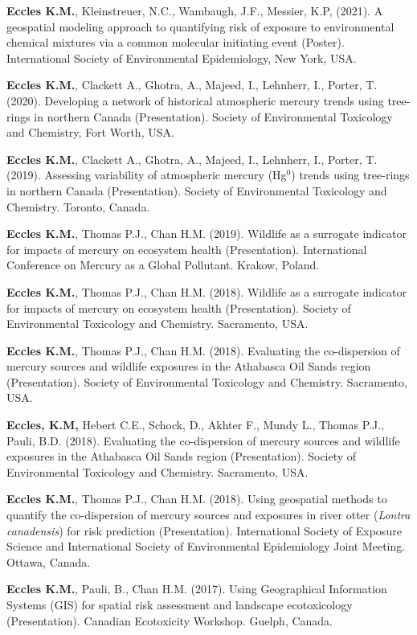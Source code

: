 \documentclass[margin,line]{res}
\begin{document}
\begin{resume}
\textbf{Eccles K.M.}, Kleinstreuer, N.C., Wambaugh, J.F., Messier, K.P, (2021). A geospatial modeling approach to quantifying risk of exposure to environmental chemical mixtures via a common molecular initiating event (Poster). International Society of Environmental Epidemiology, New York, USA.

\textbf{Eccles K.M.}, Clackett A., Ghotra, A., Majeed, I., Lehnherr, I., Porter, T. (2020). Developing a network of historical atmospheric mercury trends using tree-rings in northern Canada (Presentation).  Society of Environmental Toxicology and Chemistry, Fort Worth, USA.

\textbf{Eccles K.M.}, Clackett A., Ghotra, A., Majeed, I., Lehnherr, I., Porter, T. (2019). Assessing variability of atmospheric mercury (Hg$^{0}$) trends using tree-rings in northern Canada (Presentation). Society of Environmental Toxicology and Chemistry. Toronto, Canada.

\textbf{Eccles K.M.}, Thomas P.J., Chan H.M. (2019). Wildlife as a surrogate indicator for impacts of mercury on ecosystem health (Presentation). International Conference on Mercury as a Global Pollutant. Krakow, Poland.

\textbf{Eccles K.M.}, Thomas P.J., Chan H.M. (2018). Wildlife as a surrogate indicator for impacts of mercury on ecosystem health (Presentation). Society of Environmental Toxicology and Chemistry. Sacramento, USA.

\textbf{Eccles K.M.}, Thomas P.J., Chan H.M. (2018). Evaluating the co-dispersion of mercury sources and wildlife exposures in the Athabasca Oil Sands region (Presentation). Society of Environmental Toxicology and Chemistry. Sacramento, USA.

\textbf{Eccles, K.M,} Hebert C.E., Schock, D., Akhter F., Mundy L., Thomas P.J., Pauli, B.D. (2018). Evaluating the co-dispersion of mercury sources and wildlife exposures in the Athabasca Oil Sands region (Presentation). Society of Environmental Toxicology and Chemistry. Sacramento, USA.

\textbf{Eccles K.M.}, Thomas P.J., Chan H.M. (2018). Using geospatial methods to quantify the co-dispersion of mercury sources and exposures in river otter (\textit{Lontra canadensis}) for risk prediction (Presentation). International Society of Exposure Science and International Society of Environmental Epidemiology Joint Meeting. Ottawa, Canada.

\textbf{Eccles K.M.}, Pauli, B., Chan H.M. (2017). Using Geographical Information Systems (GIS) for spatial risk assessment and landscape ecotoxicology (Presentation). Canadian Ecotoxicity Workshop. Guelph, Canada.


\end{resume}
\end{document}
